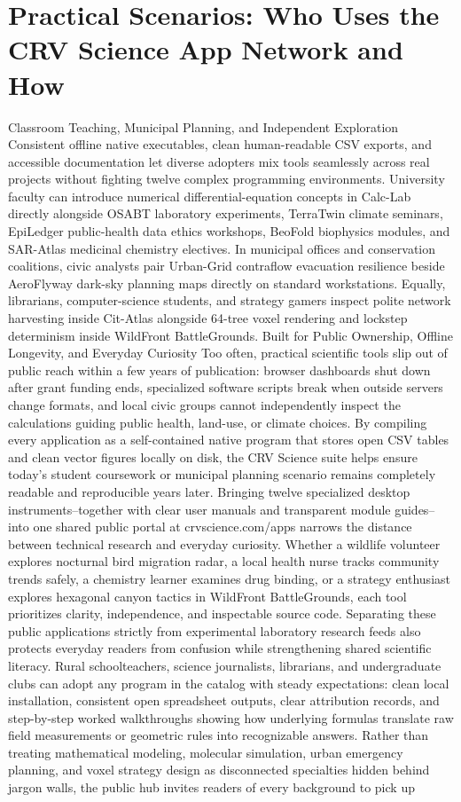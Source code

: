 \documentclass[10pt,letterpaper]{article}
\begin{document}
\section{Practical Scenarios: Who Uses the CRV Science App Network and How}
Classroom Teaching, Municipal Planning, and Independent Exploration Consistent offline native executables, clean human-readable CSV exports, and accessible documentation let diverse adopters mix tools seamlessly across real projects without fighting twelve complex programming environments. University faculty can introduce numerical differential-equation concepts in Calc-Lab directly alongside OSABT laboratory experiments, TerraTwin climate seminars, EpiLedger public-health data ethics workshops, BeoFold biophysics modules, and SAR-Atlas medicinal chemistry electives. In municipal offices and conservation coalitions, civic analysts pair Urban-Grid contraflow evacuation resilience beside AeroFlyway dark-sky planning maps directly on standard workstations. Equally, librarians, computer-science students, and strategy gamers inspect polite network harvesting inside Cit-Atlas alongside 64-tree voxel rendering and lockstep determinism inside WildFront BattleGrounds. Built for Public Ownership, Offline Longevity, and Everyday Curiosity Too often, practical scientific tools slip out of public reach within a few years of publication: browser dashboards shut down after grant funding ends, specialized software scripts break when outside servers change formats, and local civic groups cannot independently inspect the calculations guiding public health, land-use, or climate choices. By compiling every application as a self-contained native program that stores open CSV tables and clean vector figures locally on disk, the CRV Science suite helps ensure today's student coursework or municipal planning scenario remains completely readable and reproducible years later. Bringing twelve specialized desktop instruments--together with clear user manuals and transparent module guides--into one shared public portal at crvscience.com/apps narrows the distance between technical research and everyday curiosity. Whether a wildlife volunteer explores nocturnal bird migration radar, a local health nurse tracks community trends safely, a chemistry learner examines drug binding, or a strategy enthusiast explores hexagonal canyon tactics in WildFront BattleGrounds, each tool prioritizes clarity, independence, and inspectable source code. Separating these public applications strictly from experimental laboratory research feeds also protects everyday readers from confusion while strengthening shared scientific literacy. Rural schoolteachers, science journalists, librarians, and undergraduate clubs can adopt any program in the catalog with steady expectations: clean local installation, consistent open spreadsheet outputs, clear attribution records, and step-by-step worked walkthroughs showing how underlying formulas translate raw field measurements or geometric rules into recognizable answers. Rather than treating mathematical modeling, molecular simulation, urban emergency planning, and voxel strategy design as disconnected specialties hidden behind jargon walls, the public hub invites readers of every background to pick up 
\end{document}
